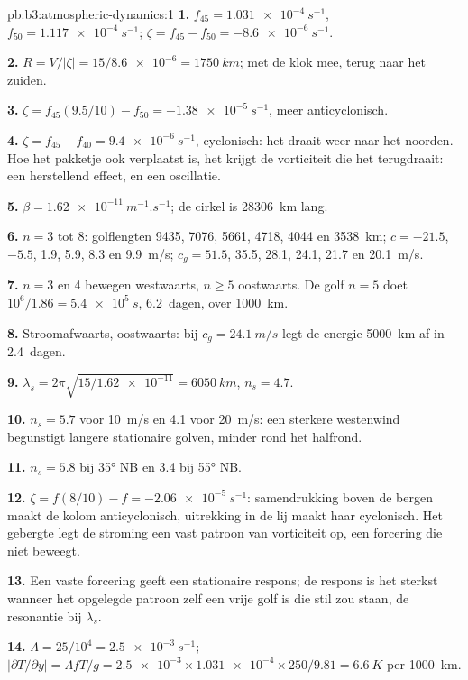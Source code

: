 \begin{solution}{pb:b3:atmospheric-dynamics:1}
\textbf{1.} $f_{45} = \qty{1.031e-4}{s^{-1}}$, $f_{50} =
\qty{1.117e-4}{s^{-1}}$; $\zeta = f_{45} - f_{50} = \qty{-8.6e-6}{s^{-1}}$.

\textbf{2.} $R = V/|\zeta| = 15/\num{8.6e-6} = \qty{1750}{km}$; met de klok mee,
terug naar het zuiden.

\textbf{3.} $\zeta = f_{45}(9.5/10) - f_{50} = \qty{-1.38e-5}{s^{-1}}$, meer
anticyclonisch.

\textbf{4.} $\zeta = f_{45} - f_{40} = \qty{+9.4e-6}{s^{-1}}$, cyclonisch: het
draait weer naar het noorden. Hoe het pakketje ook verplaatst is, het krijgt de
vorticiteit die het terugdraait: een herstellend effect, en een oscillatie.

\textbf{5.} $\beta = \qty{1.62e-11}{m^{-1}.s^{-1}}$; de cirkel is
\qty{28306}{km} lang.

\textbf{6.} $n = 3$ tot 8: golflengten 9435, 7076, 5661, 4718, 4044 en
\qty{3538}{km}; $c = -21.5$, $-5.5$, 1.9, 5.9, 8.3 en \qty{9.9}{m/s}; $c_g
= 51.5$, 35.5, 28.1, 24.1, 21.7 en \qty{20.1}{m/s}.

\textbf{7.} $n = 3$ en 4 bewegen westwaarts, $n \ge 5$ oostwaarts. De golf $n = 5$
doet $10^6/1.86 = \qty{5.4e5}{s}$, \num{6.2}~dagen, over \qty{1000}{km}.

\textbf{8.} Stroomafwaarts, oostwaarts: bij $c_g = \qty{24.1}{m/s}$ legt de energie
\qty{5000}{km} af in \num{2.4}~dagen.

\textbf{9.} $\lambda_s = 2\pi\sqrt{15/\num{1.62e-11}} = \qty{6050}{km}$,
$n_s = 4.7$.

\textbf{10.} $n_s = 5.7$ voor \qty{10}{m/s} en 4.1 voor \qty{20}{m/s}: een
sterkere westenwind begunstigt langere stationaire golven, minder rond
het halfrond.

\textbf{11.} $n_s = 5.8$ bij \ang{35} NB en 3.4 bij \ang{55} NB.

\textbf{12.} $\zeta = f(8/10) - f = \qty{-2.06e-5}{s^{-1}}$: samendrukking boven
de bergen maakt de kolom anticyclonisch, uitrekking in de lij
maakt haar cyclonisch. Het gebergte legt de stroming een vast patroon van vorticiteit op,
een forcering die niet beweegt.

\textbf{13.} Een vaste forcering geeft een stationaire respons; de respons is
het sterkst wanneer het opgelegde patroon zelf een vrije golf is die stil zou
staan, de resonantie bij $\lambda_s$.

\textbf{14.} $\Lambda = 25/10^4 = \qty{2.5e-3}{s^{-1}}$;
$|\partial T/\partial y| = \Lambda fT/g = \num{2.5e-3}\times\num{1.031e-4}
\times250/9.81 = \qty{6.6}{K}$ per \qty{1000}{km}.


\end{solution}
